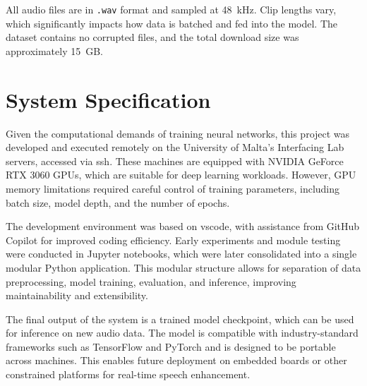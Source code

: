 All audio files are in \texttt{.wav} format and sampled at 48~kHz. Clip lengths vary, which significantly impacts how data is batched and fed into the model. The dataset contains no corrupted files, and the total download size was approximately 15~GB.

\section{System Specification}
\label{sec:system_specification}

Given the computational demands of training neural networks, this project was developed and executed remotely on the University of Malta’s Interfacing Lab servers, accessed via \gls{ssh}. These machines are equipped with NVIDIA GeForce RTX 3060 GPUs, which are suitable for deep learning workloads. However, GPU memory limitations required careful control of training parameters, including batch size, model depth, and the number of epochs.

The development environment was based on \gls{vscode}, with assistance from GitHub Copilot for improved coding efficiency. Early experiments and module testing were conducted in Jupyter notebooks, which were later consolidated into a single modular Python application. This modular structure allows for separation of data preprocessing, model training, evaluation, and inference, improving maintainability and extensibility.

The final output of the system is a trained model checkpoint, which can be used for inference on new audio data. The model is compatible with industry-standard frameworks such as TensorFlow and PyTorch and is designed to be portable across machines. This enables future deployment on embedded boards or other constrained platforms for real-time speech enhancement.

